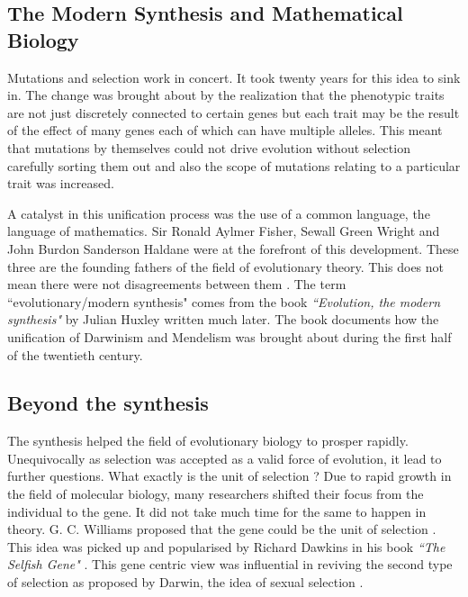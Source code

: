 \documentclass[oneside,11pt,a4paper]{book}
\begin{document}
\subsection{The Modern Synthesis and Mathematical Biology}

Mutations and selection work in concert.
It took twenty years for this idea to sink in.
The change was brought about by the realization that the phenotypic traits are not just discretely connected to certain genes but each trait may be the result of the effect of many genes each of which can have multiple alleles.
This meant that mutations by themselves could not drive evolution without selection carefully sorting them out and also the scope of mutations relating to a particular trait was increased.

A catalyst in this unification process was the use of a common language, the language of mathematics.
Sir Ronald Aylmer Fisher, Sewall Green Wright and John Burdon Sanderson Haldane were at the forefront of this development.
These three are the founding fathers of the field of evolutionary theory.
This does not mean there were not disagreements between them \citep{mitchell:2009bo}.
The term ``evolutionary/modern synthesis" comes from the book \textit{``Evolution, the modern synthesis"} by Julian Huxley \citep{huxley:1942bo} written much later.
The book documents how the unification of Darwinism and Mendelism was brought about during the first half of the twentieth century.

\subsection{Beyond the synthesis}

The synthesis helped the field of evolutionary biology to prosper rapidly.
Unequivocally as selection was accepted as a valid force of evolution, it lead to further questions.
What exactly is the unit of selection \citep{mayr:1997se}?
Due to rapid growth in the field of molecular biology, many researchers shifted their focus from the individual to the gene.
It did not take much time for the same to happen in theory.
G. C. Williams proposed that the gene could be the unit of selection \citep{williams:1966sg}.
This idea was picked up and popularised by Richard Dawkins in his book \textit{``The Selfish Gene"} \citep{dawkins:1976fn}.
This gene centric view was influential in reviving the second type of selection as proposed by Darwin, the idea of sexual selection \citep{darwin:1871dm,bowler:2009bo}.
\end{document}
